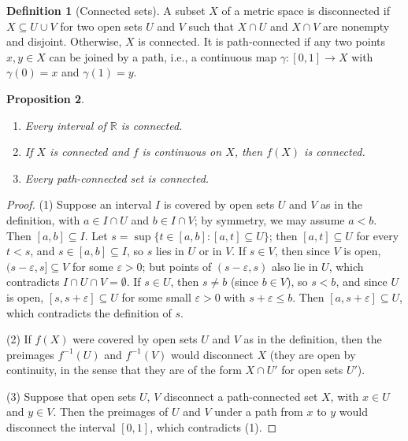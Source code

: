 \documentclass[11pt]{article}
\theoremstyle{definition}
\newtheorem{definition}{Definition}[section]
\theoremstyle{plain}
\newtheorem{proposition}[definition]{Proposition}
\theoremstyle{remark}
\begin{document}
\begin{definition}[Connected sets]\label{def:connected}
    A subset $X$ of a metric space is disconnected if $X \subseteq U \cup V$ for two open sets $U$ and $V$ such that $X \cap U$ and $X \cap V$ are nonempty and disjoint. Otherwise, $X$ is connected. It is path-connected if any two points $x, y \in X$ can be joined by a path, i.e., a continuous map $\gamma: [0, 1] \to X$ with $\gamma(0) = x$ and $\gamma(1) = y$.
\end{definition}

\begin{proposition}\label{prop:connected}
    \begin{enumerate}
        \item Every interval of $\mathbb{R}$ is connected.
        \item If $X$ is connected and $f$ is continuous on $X$, then $f(X)$ is connected.
        \item Every path-connected set is connected.
    \end{enumerate}
\end{proposition}

\begin{proof}
    (1) Suppose an interval $I$ is covered by open sets $U$ and $V$ as in the definition, with $a \in I \cap U$ and $b \in I \cap V$; by symmetry, we may assume $a < b$. Then $[a, b] \subseteq I$. Let $s = \sup\{t \in [a, b] : [a, t] \subseteq U\}$; then $[a, t] \subseteq U$ for every $t < s$, and $s \in [a, b] \subseteq I$, so $s$ lies in $U$ or in $V$. If $s \in V$, then since $V$ is open, $(s - \varepsilon, s] \subseteq V$ for some $\varepsilon > 0$; but points of $(s - \varepsilon, s)$ also lie in $U$, which contradicts $I \cap U \cap V = \emptyset$. If $s \in U$, then $s \neq b$ (since $b \in V$), so $s < b$, and since $U$ is open, $[s, s + \varepsilon] \subseteq U$ for some small $\varepsilon > 0$ with $s + \varepsilon \leq b$. Then $[a, s + \varepsilon] \subseteq U$, which contradicts the definition of $s$.

    (2) If $f(X)$ were covered by open sets $U$ and $V$ as in the definition, then the preimages $f^{-1}(U)$ and $f^{-1}(V)$ would disconnect $X$ (they are open by continuity, in the sense that they are of the form $X \cap U'$ for open sets $U'$).

    (3) Suppose that open sets $U$, $V$ disconnect a path-connected set $X$, with $x \in U$ and $y \in V$. Then the preimages of $U$ and $V$ under a path from $x$ to $y$ would disconnect the interval $[0, 1]$, which contradicts (1).
\end{proof}
\end{document}
